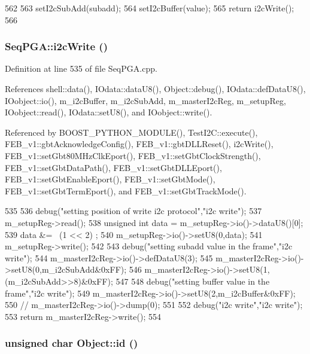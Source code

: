 \begin{DoxyCode}
562                                                                             {
563   setI2cSubAdd(subadd);
564   setI2cBuffer(value);
565   return i2cWrite();
566 }
\end{DoxyCode}
\hypertarget{classSeqPGA_a429076ca3a4ece94182bd95c623bb9d0}{
\subsubsection[{i2cWrite}]{ SeqPGA::i2cWrite ()}}
\label{classSeqPGA_a429076ca3a4ece94182bd95c623bb9d0}


Definition at line 535 of file SeqPGA.cpp.

References shell::data(), IOdata::dataU8(), Object::debug(), IOdata::defDataU8(), IOobject::io(), m\_\-i2cBuffer, m\_\-i2cSubAdd, m\_\-masterI2cReg, m\_\-setupReg, IOobject::read(), IOdata::setU8(), and IOobject::write().

Referenced by BOOST\_\-PYTHON\_\-MODULE(), TestI2C::execute(), FEB\_\-v1::gbtAcknowledgeConfig(), FEB\_\-v1::gbtDLLReset(), i2cWrite(), FEB\_\-v1::setGbt80MHzClkEport(), FEB\_\-v1::setGbtClockStrength(), FEB\_\-v1::setGbtDataPath(), FEB\_\-v1::setGbtDLLEport(), FEB\_\-v1::setGbtEnableEport(), FEB\_\-v1::setGbtMode(), FEB\_\-v1::setGbtTermEport(), and FEB\_\-v1::setGbtTrackMode().


\begin{DoxyCode}
535                            {
536   debug("setting position of write i2c protocol","i2c write");
537   m_setupReg->read();
538   unsigned int data = m_setupReg->io()->dataU8()[0];
539   data &= ~(1 << 2)  ; 
540   m_setupReg->io()->setU8(0,data);
541   m_setupReg->write();
542 
543   debug("setting subadd value in the frame","i2c write");
544   m_masterI2cReg->io()->defDataU8(3);
545   m_masterI2cReg->io()->setU8(0,m_i2cSubAdd&0xFF);
546   m_masterI2cReg->io()->setU8(1,(m_i2cSubAdd>>8)&0xFF);
547 
548   debug("setting buffer value in the frame","i2c write");
549   m_masterI2cReg->io()->setU8(2,m_i2cBuffer&0xFF);
550   //  m_masterI2cReg->io()->dump(0);
551 
552   debug("i2c write","i2c write");
553   return m_masterI2cReg->write();
554 }
\end{DoxyCode}
\hypertarget{classObject_af99145335cc61ff6e2798ea17db009d2}{
\subsubsection[{id}]{\setlength{\rightskip}{0pt plus 5cm}unsigned char Object::id ()}}
\label{classObject_af99145335cc61ff6e2798ea17db009d2}



